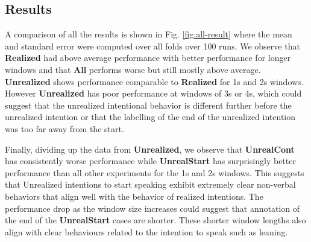 \documentclass[sigconf]{acmart}
\begin{document}

\subsection{Results}
\label{sec:res}
A comparison of all the results is shown in Fig. \ref{fig:all-result} where the mean and standard error were computed over all folds over 100 runs. We observe that \textbf{Realized} had above average performance with better performance for longer windows and that \textbf{All} performs worse but still mostly above average. \textbf{Unrealized} shows performance comparable to \textbf{Realized} for 1s and 2s windows. However \textbf{Unrealized} has poor performance at windows of 3s or 4s, which could suggest that the unrealized intentional behavior is different further before the unrealized intention or that the labelling of the end of the unrealized intention was too far away from the start. 

Finally, dividing up the data from \textbf{Unrealized}, we observe that \textbf{UnrealCont} has consistently worse performance while \textbf{UnrealStart} has surprisingly better performance than all other experiments for the 1s and 2s windows. This suggests that Unrealized intentions to start speaking exhibit extremely clear non-verbal behaviors that align well with the behavior of realized intentions. The performance drop as the window size increases could suggest that annotation of the end of the \textbf{UnrealStart} cases are shorter. These shorter window lengths also align with clear behaviours related to the intention to speak such as leaning. 
\end{document}
